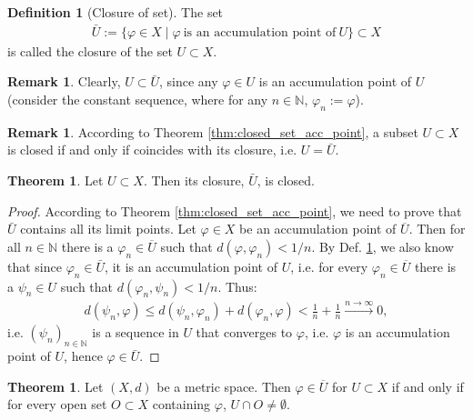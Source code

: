 \documentclass[12pt, a4paper]{article}
\numberwithin{equation}{section}
\theoremstyle{definition}
\theoremstyle{definition}
\newtheorem{defn}[thm]{Definition} %
\newtheorem{remark}[thm]{Remark} %
\newtheorem{theorem}[thm]{Theorem}
\begin{document}
	\begin{defn}[Closure of set]\label{defn:closure_set}
		The set 
		\begin{align}
			\bar{U} := \{\varphi\in X\mid \varphi\ \text{is an accumulation point of}\ U\} \subset X
		\end{align}
		is called the closure of the set $U \subset X$.
	\end{defn}

	\begin{remark}\label{remark:closure_superset}
		Clearly, $U\subset \bar{U}$, since any $\varphi\in U$ is an accumulation point of $U$ (consider the constant sequence, where for any $n\in\mathbb N$, $\varphi_n := \varphi$).
	\end{remark}

	\begin{remark}
		According to Theorem \ref{thm:closed_set_acc_point}, a subset $U\subset X$ is closed if and only if coincides with its closure, i.e. $U = \bar{U}$.
	\end{remark}
	
	\begin{theorem}\label{thrm:closure_closed}
		Let $U\subset X$. Then its closure, $\bar{U}$, is closed.
	\end{theorem}

	\begin{proof}
		According to Theorem \ref{thm:closed_set_acc_point}, we need to prove that $\bar{U}$ contains all its limit points. Let $\varphi\in X$ be an accumulation point of $\overline{U}$. Then for all $n\in \mathbb N$ there is a $\varphi_n\in\overline{U}$ such that $d(\varphi, \varphi_n) < 1/n$. By Def. \ref{defn:closure_set}, we also know that since $\varphi_n\in \bar{U}$, it is an accumulation point of $U$, i.e. for every $\varphi_n\in \overline{U}$ there is a $\psi_n\in U$ such that $d(\varphi_n, \psi_n) < 1/n$. Thus:
		\begin{align}
			d(\psi_n, \varphi) \leq d(\psi_n, \varphi_n) + d(\varphi_n, \varphi) < \frac{1}{n} + \frac{1}{n} \overset{n\to\infty}{\longrightarrow} 0,
		\end{align}
		i.e. $(\psi_n)_{n\in\mathbb N}$ is a sequence in $U$ that converges to $\varphi$, i.e. $\varphi$ is an accumulation point of $U$, hence $\varphi\in \bar{U}$.
	\end{proof}
	
	\begin{theorem}\label{thrm:property_metric_space}
		Let $(X, d)$ be a metric space. Then $\varphi\in \overline{U}$ for $U\subset X$ if and only if for every open set $O\subset X$ containing $\varphi$, $U\cap O\ne \emptyset$.
	\end{theorem}
\end{document}
